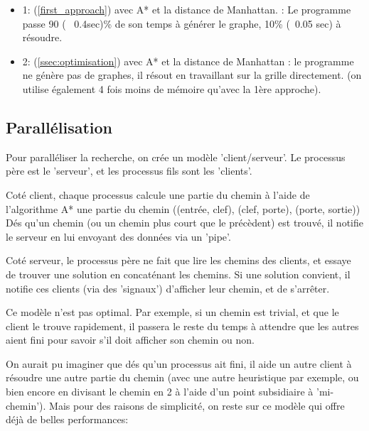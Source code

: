 \documentclass[10pt]{article}
\begin{document}
			\begin{itemize}[label=-]
				\setlength\itemsep{0.1em}
				\item 1: (\ref{first_approach}) avec A* et la distance de Manhattan. : Le programme passe 90 (~ 0.4sec)\%
				de son temps à générer le graphe, 10\% (~0.05 sec) à résoudre.
				\item 2: (\ref{ssec:optimisation}) avec A* et la distance de Manhattan : le programme ne génère pas de graphes, il résout
				en travaillant sur la grille directement. (on utilise également 4 fois moins de mémoire qu'avec la 1ère approche).
			\end{itemize}

		\subsection{Parallélisation}
			Pour paralléliser la recherche, on crée un modèle 'client/serveur'.
			Le processus père est le 'serveur', et les processus fils sont les 'clients'.\newline

			Coté client, chaque processus calcule une partie du chemin à l'aide de l'algorithme A*
			une partie du chemin ((entrée, clef), (clef, porte), (porte, sortie))
			Dés qu'un chemin (ou un chemin plus court que le précèdent) est trouvé, il notifie le serveur
			en lui envoyant des données via un 'pipe'.\newline
			
			Coté serveur, le processus père ne fait que lire les chemins des clients, et essaye de trouver une
			solution en concaténant les chemins. Si une solution convient, il notifie ces clients (via des 'signaux')
			d'afficher leur chemin, et de s'arrêter.\newline
			
			Ce modèle n'est pas optimal. Par exemple, si un chemin est trivial, et que le client
			le trouve rapidement, il passera le reste du temps à attendre que les autres aient fini
			pour savoir s'il doit afficher son chemin ou non.\newline
			
			On aurait pu imaginer que dés qu'un processus ait fini, il aide un autre client à résoudre une autre partie du chemin
			(avec une autre heuristique par exemple, ou bien encore en divisant le chemin en 2 à l'aide d'un point subsidiaire à 'mi-chemin').
			Mais pour des raisons de simplicité, on reste sur ce modèle qui offre déjà de belles performances:
			
\end{document}
